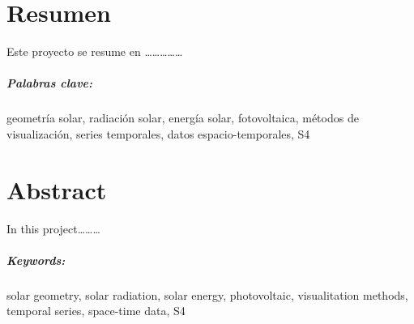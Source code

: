 \chapter*{Resumen}

Este proyecto se resume en \ldots{}\ldots{}\ldots{}\ldots{}\ldots{}

\paragraph{Palabras clave:}
geometría solar, radiación solar, energía solar, fotovoltaica, métodos de visualización, series temporales, datos espacio-temporales, S4

\chapter*{Abstract}

In this project\ldots{}\ldots{}\ldots{}

\paragraph{Keywords:}
solar geometry, solar radiation, solar energy, photovoltaic, visualitation methods, temporal series, space-time data, S4
